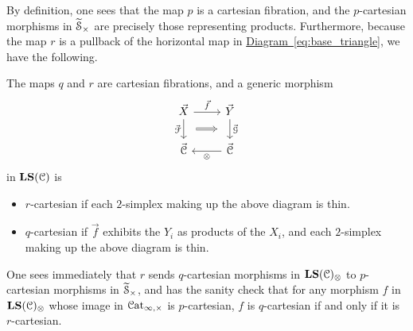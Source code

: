 \documentclass[main.tex]{subfiles}
\begin{document}
By definition, one sees that the map $p$ is a cartesian fibration, and the $p$-cartesian morphisms in $\widetilde{\mathcal{S}}_{\times}$ are precisely those representing products. Furthermore, because the map $r$ is a pullback of the horizontal map in \hyperref[eq:base_triangle]{Diagram~\ref*{eq:base_triangle}}, we have the following.

\begin{proposition}
  The maps $q$ and $r$ are cartesian fibrations, and a generic morphism
  \begin{equation*}
    \begin{tikzcd}
      \vec{X}
      \arrow[r, "\vec{f}"]
      \arrow[d, ""{name=L, right}, "\vec{\mathcal{F}}"{left}]
      & \vec{Y}
      \arrow[d, ""{name=R, left}, "\vec{\mathcal{G}}"{right}]
      \\
      \vec{\category{C}}
      & \vec{\category{C}}
      \arrow[l, "\otimes"]
      \arrow[Rightarrow, from=L, to=R, shorten=1.5ex]
    \end{tikzcd}
  \end{equation*}
  in $\mathbf{LS}(\mathcal{C})$ is
  \begin{itemize}
    \item $r$-cartesian if each $2$-simplex making up the above diagram is thin.

    \item $q$-cartesian if $\vec{f}$ exhibits the $Y_{i}$ as products of the $X_{i}$, and each $2$-simplex making up the above diagram is thin.
  \end{itemize}
\end{proposition}
One sees immediately that $r$ sends $q$-cartesian morphisms in $\mathbf{LS}(\mathcal{C})_{\otimes}$ to $p$-cartesian morphisms in $\widetilde{\mathcal{S}}_{\times}$, and has the sanity check that for any morphism $f$ in $\mathbf{LS}(\mathcal{C})_{\otimes}$ whose image in $\mathcal{C}\mathrm{at}_{\infty,\times}$ is $p$-cartesian, $f$ is $q$-cartesian if and only if it is $r$-cartesian.
\end{document}
